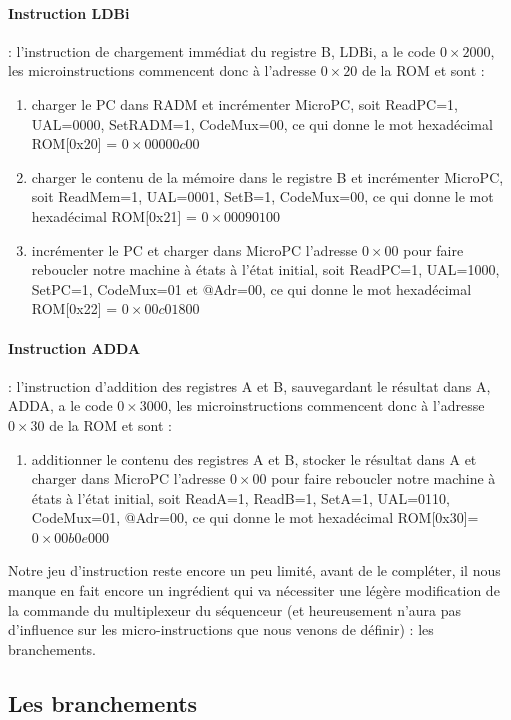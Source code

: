 \paragraph{Instruction LDBi} : l'instruction de chargement immédiat du registre B, LDBi, a le code $0\times2000$, les microinstructions commencent donc à l'adresse $0\times20$ de la ROM et sont :
\begin{enumerate}
\item charger le PC dans RADM et incrémenter MicroPC, soit ReadPC=1, UAL=0000, SetRADM=1, CodeMux=00, ce qui donne le mot hexadécimal ROM[0x20] = $0\times00000c00$
\item charger le contenu de la mémoire dans le registre B et incrémenter MicroPC, soit ReadMem=1, UAL=0001, SetB=1, CodeMux=00, ce qui donne le mot hexadécimal ROM[0x21] = $0\times00090100$
\item incrémenter le PC et charger dans MicroPC l'adresse $0\times00$ pour faire reboucler notre machine à états à l'état initial, soit ReadPC=1, UAL=1000, SetPC=1, CodeMux=01 et @Adr=00, ce qui donne le mot hexadécimal ROM[0x22] = $0\times00c01800$
\end{enumerate}

\paragraph{Instruction ADDA} : l'instruction d'addition des registres A et B, sauvegardant le résultat dans A, ADDA, a le code $0\times3000$, les microinstructions commencent donc à l'adresse $0\times30$ de la ROM et sont :
\begin{enumerate}
\item additionner le contenu des registres A et B, stocker le résultat dans A et charger dans MicroPC l'adresse $0\times00$ pour faire reboucler notre machine à états à l'état initial, soit ReadA=1, ReadB=1, SetA=1, UAL=0110, CodeMux=01, @Adr=00, ce qui donne le mot hexadécimal ROM[0x30]=$0\times00b0e000$
\end{enumerate}


Notre jeu d'instruction reste encore un peu limité, avant de le compléter, il nous manque en fait encore un ingrédient qui va nécessiter une légère modification de la commande du multiplexeur du séquenceur (et heureusement n'aura pas d'influence sur les micro-instructions que nous venons de définir) : les branchements.

\subsection{Les branchements}

